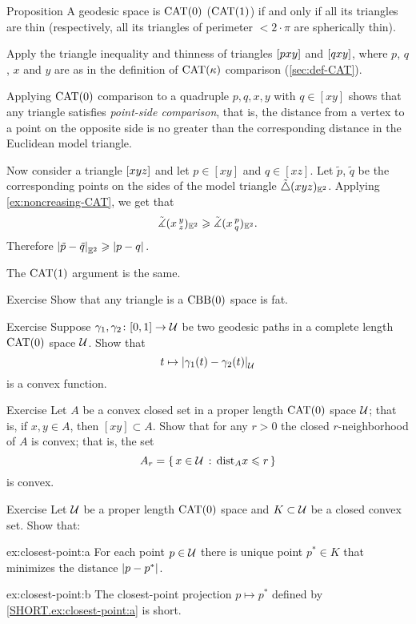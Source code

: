 \begin{thm}{Proposition}\label{prop:thin=cat}
A geodesic space is $\mathrm{CAT}(0)$ 
($\mathrm{CAT}(1)$) 
if and only if 
all its triangles are thin (respectively, all its triangles of perimeter $<2\cdot\pi$ are spherically thin).
\end{thm}

Apply  the triangle inequality and thinness of triangles $[pxy]$ and $[qxy]$, where $p$, $q$, $x$ and $y$ are as in the definition of $\mathrm{CAT}(\kappa)$ comparison (\ref{sec:def-CAT}).

Applying $\mathrm{CAT}(0)$ comparison to a quadruple $p,q,x,y$ with $q\in [xy]$ shows that any triangle satisfies \emph{point-side comparison}, that is, the distance from a vertex to a  point on the opposite side is no greater than the corresponding distance in the Euclidean model triangle.  

Now consider a triangle $[xyz]$ and let $p\in [xy]$ and $q\in [xz]$.
Let $\tilde p$, $\tilde q$ be the corresponding points on the sides of the model triangle $\tilde\triangle({x}{y}{z})_{\mathbb{E}^2}$.
Applying \ref{ex:noncreasing-CAT}, we get that
\[\tilde\measuredangle(x\,{}^{y}_{z})_{\mathbb{E}^2} \geqslant \tilde\measuredangle(x\,{}^{p}_{q}) _{\mathbb{E}^2}.\]
Therefore $ \dist{\tilde p}{\tilde q}{\EE^2}\ge \dist{p}{q}{}$.

The $\mathrm{CAT}(1)$ argument is the same.
\qeds

\begin{thm}{Exercise}\label{ex:fat-triangle}
Show that any triangle is a $\mathrm{CBB}(0)$ space is fat. 
\end{thm}

\begin{thm}{Exercise}\label{ex:convex-dist}
Suppose $\gamma_1,\gamma_2\colon[0,1]\to \mathcal{U}$ be two geodesic paths in a complete length $\mathrm{CAT}(0)$ space $\mathcal{U}$.
Show that
\[t\mapsto\dist{\gamma_1(t)}{\gamma_2(t)}{\spc{U}}\]
is a convex function.
\end{thm}

\begin{thm}{Exercise}\label{ex:convex-nbhd}
Let $A$ be a convex closed set in a proper length $\mathrm{CAT}(0)$ space $\mathcal{U}$;
that is, if $x,y\in A$, then $[xy]\subset A$.
Show that for any $r>0$ the closed $r$-neighborhood of $A$ is convex;
that is, the set
\[A_r=\left\{\,{x\in \mathcal{U}}\,:\,{\mathrm{dist}_Ax\leqslant r}\,\right\}\]
is convex.
\end{thm}

\begin{thm}{Exercise}\label{ex:closest-point}
Let  $\mathcal{U}$ be a proper length $\mathrm{CAT}(0)$ space 
and $K\subset \mathcal{U}$ be a closed convex set.
Show that: 

\begin{subthm}{ex:closest-point:a}
For each point $p\in \mathcal{U}$ there is unique point $p^*\in K$ that minimizes the distance $\dist{p}{p^*}{}$.
\end{subthm}

\begin{subthm}{ex:closest-point:b}
The closest-point projection $p\mapsto p^*$ defined by \ref{SHORT.ex:closest-point:a} is short. 
\end{subthm}

\end{thm}

